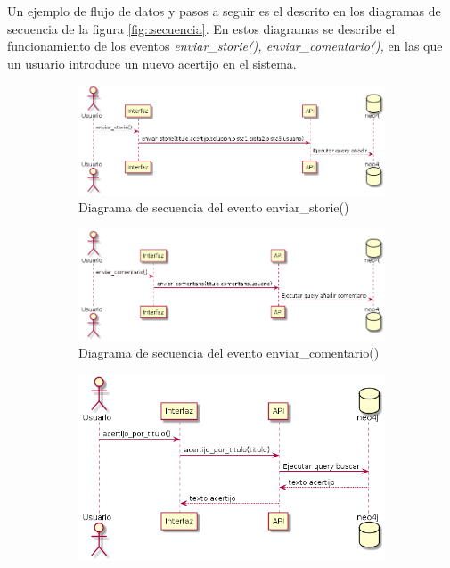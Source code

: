 Un ejemplo de flujo de datos y pasos a seguir es el descrito en los diagramas de secuencia de la figura \ref{fig::secuencia}. En estos diagramas se describe el funcionamiento de los eventos \textit{enviar\_storie(), enviar\_comentario(),} en las que un usuario introduce un nuevo acertijo en el sistema.

\begin{figure}[hbtp] \centering
\begin{subfigure}{.6\textwidth}
     \centerline{\includegraphics[width=11cm]{figuras/enviar_storie.png}}
    \caption{Diagrama de secuencia del evento enviar\_storie()} 
    \label{fig::enviarstorie}
\end{subfigure}
\begin{subfigure}{.6\textwidth}
     \centerline{\includegraphics[width=11cm]{figuras/enviar_comentario.png}}
    \caption{Diagrama de secuencia del evento enviar\_comentario()} 
    \label{fig::enviarcomentario}
\end{subfigure}
\begin{subfigure}{.6\textwidth}
     \centerline{\includegraphics[width=11cm]{figuras/acertijo_por_titulo.png}}

\end{subfigure}
\end{figure}
